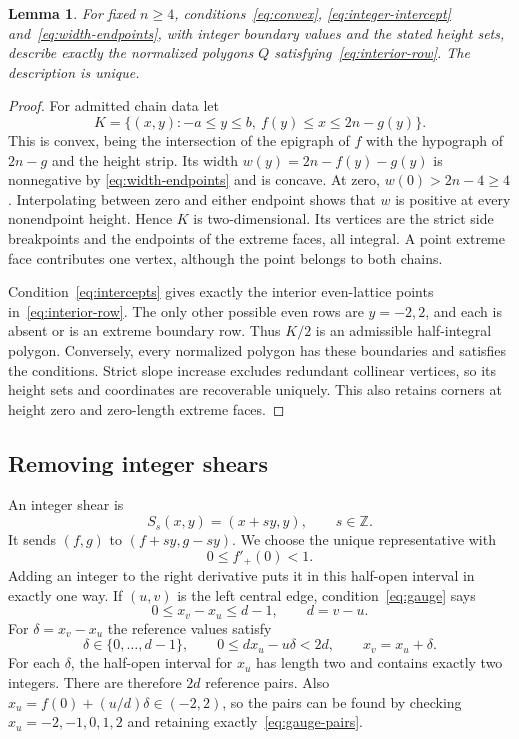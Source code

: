 \documentclass[11pt]{article}
\newtheorem{lemma}[theorem]{Lemma}
\theoremstyle{remark}
\numberwithin{equation}{section}
\newcommand{\Z}{\mathbb Z}
\begin{document}
\begin{lemma}\label{lem:encoding}
For fixed $n\geq4$, conditions~\eqref{eq:convex},
\eqref{eq:integer-intercept} and~\eqref{eq:width-endpoints}, with integer
boundary values and the stated height sets, describe exactly the normalized
polygons $Q$ satisfying~\eqref{eq:interior-row}. The description is unique.
\end{lemma}

\begin{proof}
For admitted chain data let
\[
 K=\{(x,y):-a\leq y\leq b,\ f(y)\leq x\leq2n-g(y)\}.
\]
This is convex, being the intersection of the epigraph of $f$ with the
hypograph of $2n-g$ and the height strip.
Its width $w(y)=2n-f(y)-g(y)$ is nonnegative by
\eqref{eq:width-endpoints} and is concave. At zero,
$w(0)>2n-4\geq4$.
Interpolating between zero and either endpoint shows that $w$ is positive
at every nonendpoint height. Hence $K$ is two-dimensional.
Its vertices are the strict side breakpoints and the endpoints of the
extreme faces, all integral. A point extreme face contributes one vertex,
although the point belongs to both chains.

Condition~\eqref{eq:intercepts} gives exactly the interior even-lattice
points in~\eqref{eq:interior-row}. The only other possible even rows are
$y=-2,2$, and each is absent or is an extreme boundary row.
Thus $K/2$ is an admissible half-integral polygon.
Conversely, every normalized polygon has these boundaries and satisfies
the conditions. Strict slope increase excludes redundant collinear
vertices, so its height sets and coordinates are recoverable uniquely.
This also retains corners at height zero and zero-length extreme faces.
\end{proof}

\subsection{Removing integer shears}

An integer shear is
\[
 S_s(x,y)=(x+s y,y),\qquad s\in\Z.
\]
It sends $(f,g)$ to $(f+s y,g-s y)$.
We choose the unique representative with
\begin{equation}\label{eq:gauge}
 0\leq f'_+(0)<1.
\end{equation}
Adding an integer to the right derivative puts it in this half-open
interval in exactly one way.
If $(u,v)$ is the left central edge, condition~\eqref{eq:gauge} says
\[
 0\leq x_v-x_u\leq d-1,\qquad d=v-u.
\]
For $\delta=x_v-x_u$ the reference values satisfy
\begin{equation}\label{eq:gauge-pairs}
 \delta\in\{0,\ldots,d-1\},\qquad
 0\leq d x_u-u\delta<2d,\qquad x_v=x_u+\delta.
\end{equation}
For each $\delta$, the half-open interval for $x_u$ has length two and
contains exactly two integers. There are therefore $2d$ reference pairs.
Also
$x_u=f(0)+(u/d)\delta\in(-2,2)$, so the pairs can be found by checking
$x_u=-2,-1,0,1,2$ and retaining exactly~\eqref{eq:gauge-pairs}.
\end{document}
